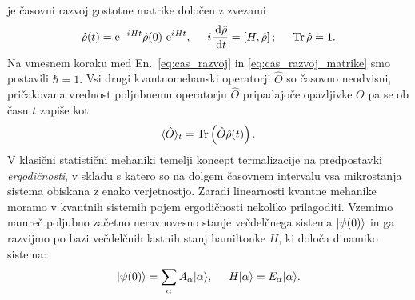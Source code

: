  je časovni razvoj gostotne matrike določen z zvezami 	
\begin{equation}\label{eq:cas_razvoj_matrike}
\hat{\rho}(t)=\mathrm{e}^{-{i\mkern1mu} H t}\hat{\rho}(0)\ \mathrm{e}^{{i\mkern1mu} H t}, \hspace{5mm} {i\mkern1mu}\frac{\,\mathrm{d} \hat{\rho}}{\,\mathrm{d} t}=\left[H, \hat{\rho}\right]; \hspace{5mm} \mathop{\rm Tr}{\hat{\rho}}=1.
\end{equation}
Na vmesnem koraku med En.~\eqref{eq:cas_razvoj} in \eqref{eq:cas_razvoj_matrike} smo postavili $\hbar=1.$ Vsi drugi kvantnomehanski operatorji $\hat{O}$ so časovno neodvisni, pričakovana vrednost poljubnemu operatorju $\hat{O}$ pripadajoče opazljivke $O$ pa se ob času $t$ zapiše kot 
\begin{equation}
\langle \hat{O}\rangle_t = \mathop{\rm Tr}\left(\hat{O}\hat{\rho}(t)\right).
\end{equation}
V klasični statistični mehaniki temelji koncept termalizacije na predpostavki \emph{ergodičnosti}, v skladu s katero so na dolgem časovnem intervalu vsa mikrostanja sistema obiskana z enako verjetnostjo. Zaradi linearnosti kvantne mehanike moramo v kvantnih sistemih pojem ergodičnosti nekoliko prilagoditi. Vzemimo namreč poljubno začetno neravnovesno stanje večdelčnega sistema $\vert\psi(0)\rangle$ in ga razvijmo po bazi večdelčnih lastnih stanj hamiltonke $H$, ki določa dinamiko sistema:
\begin{equation}\label{eq:lastna_stanja}
\vert\psi(0)\rangle=\sum\limits_\alpha A_\alpha \vert\alpha\rangle, \hspace{5mm} H\vert\alpha\rangle=E_\alpha\vert\alpha\rangle.
\end{equation}
